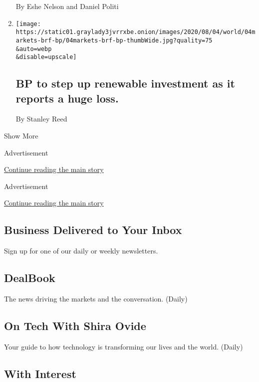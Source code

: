 \begin{enumerate}
  By Eshe Nelson and Daniel Politi
\item
  \href{/2020/08/04/business/bp-to-step-up-renewable-investment-as-it-reports-a-huge-loss.html}{}

  \texttt{[image: https://static01.graylady3jvrrxbe.onion/images/2020/08/04/world/04markets-brf-bp/04markets-brf-bp-thumbWide.jpg?quality=75\\\&auto=webp\\\&disable=upscale]}

  \hypertarget{bp-to-step-up-renewable-investment-as-it-reports-a-huge-loss}{%
  \subsection{BP to step up renewable investment as it reports a huge
  loss.}\label{bp-to-step-up-renewable-investment-as-it-reports-a-huge-loss}}

  By Stanley Reed
\end{enumerate}

Show More

Advertisement

\protect\hyperlink{after-mid2}{Continue reading the main story}

Advertisement

\protect\hyperlink{after-mktg}{Continue reading the main story}

\hypertarget{business-delivered-to-your-inbox}{%
\subsection{Business Delivered to Your
Inbox}\label{business-delivered-to-your-inbox}}

Sign up for one of our daily or weekly newsletters.

\hypertarget{dealbook}{%
\subsection{DealBook}\label{dealbook}}

The news driving the markets and the conversation. (Daily)

\hypertarget{on-tech-with-shira-ovide}{%
\subsection{On Tech With Shira Ovide}\label{on-tech-with-shira-ovide}}

Your guide to how technology is transforming our lives and the world.
(Daily)

\hypertarget{with-interest}{%
\subsection{With Interest}\label{with-interest}}

